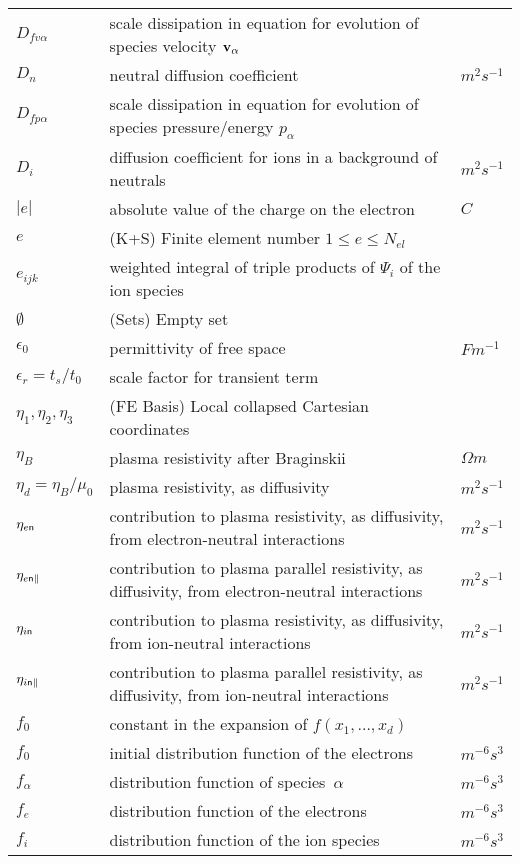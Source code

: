 \begin{longtable}{|p{3.0cm}|p{10.0cm}|p{3.0cm}|}
$D_{fv\alpha}$ & scale dissipation in  equation for evolution of species velocity ${\bf v}_\alpha$ & \\
$D_n$ & neutral diffusion coefficient  &  $m^2 s^{-1}$ \\
$D_{fp\alpha}$ & scale dissipation in  equation for evolution of species pressure/energy $p_\alpha$ & \\
$D_i$ & diffusion coefficient for ions in a background of neutrals  &  $m^2 s^{-1}$ \\
$|e|$ & absolute value of the charge on the electron & $C$ \\
$e$ &  (K+S) Finite element number $1 \leq e \leq N_{el}$ & \\
$e_{ijk}$ & weighted integral of triple products of $\Psi_i$ of the ion species & \\
$\emptyset$ &  (Sets) Empty set & \\
$\epsilon_0$ & permittivity of free space  &  $F m^{-1}$ \\
$\epsilon_r=t_s/t_0$ & scale factor for transient term  & \\
$\eta_1, \eta_2, \eta_3$ &  (FE Basis) Local collapsed Cartesian coordinates & \\
$\eta_B$ & plasma resistivity after Braginskii  &  $\Omega m$ \\
$\eta_d=\eta_B/\mu_0$ & plasma resistivity, as diffusivity  &  $m^2 s^{-1}$ \\
$\eta_{e{\sf n}}$ & contribution to plasma resistivity, as diffusivity, from electron-neutral interactions  &  $m^2 s^{-1}$ \\
$\eta_{e{\sf n}\|}$ & contribution to plasma parallel resistivity, as diffusivity, from electron-neutral interactions  &  $m^2 s^{-1}$ \\
$\eta_{i{\sf n}}$ & contribution to plasma resistivity, as diffusivity, from ion-neutral interactions  &  $m^2 s^{-1}$ \\
$\eta_{i{\sf n}\|}$ & contribution to plasma parallel resistivity, as diffusivity, from ion-neutral interactions  &  $m^2 s^{-1}$ \\
$f_0$ & constant in the expansion of $f\left(x_1,\ldots,x_d\right)$  & \\
$f_0$ & initial distribution function of the electrons & $m^{-6} s^3$ \\
$f_\alpha$ & distribution function of species~$\alpha$ & $m^{-6} s^3$ \\
$f_e$ & distribution function of the electrons & $m^{-6} s^3$ \\
$f_i$ & distribution function of the ion species & $m^{-6} s^3$ \\

\end{longtable}
